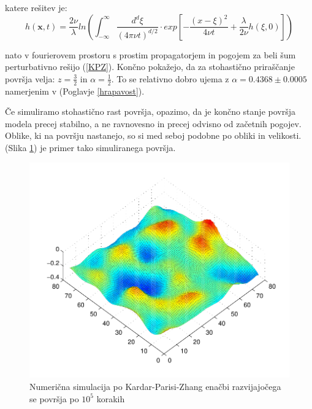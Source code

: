 \documentclass[a4paper, oneside, 12pt]{book}
\begin{document}
        katere rešitev je:
        \begin{equation}
            h(\mathbf{x},t) = \frac{2 \nu}{\lambda} ln \left( \int_{-\infty}^{\infty} \frac{d^d \xi}{(4 \pi \nu t)^{d/2}} \cdot exp \left[-\frac{(x-\xi)^2}{4 \nu t} + \frac{\lambda}{2 \nu}h(\xi,0) \right] \right)
        \end{equation}

            \cite{kardar1986dynamic} nato v fourierovem prostoru s prostim propagatorjem in pogojem za beli šum perturbativno rešijo (\ref{KPZ}). Končno pokažejo, da za stohastično priraščanje površja velja: $z = \frac{3}{2}$ in $\alpha=\frac{1}{2}$. To se relativno dobro ujema z $\alpha=0.4368 \pm 0.0005$ namerjenim v (Poglavje \ref{hrapavost}).


            Če simuliramo stohastično rast površja, opazimo, da je končno stanje površja modela precej stabilno, a ne ravnovesno in precej odvisno od začetnih pogojev. Oblike, ki na površju nastanejo, so si med seboj podobne po obliki in velikosti. (Slika \ref{fig:KPZ-numericno}) je primer tako simuliranega površja.

            \begin{figure}[H]
              \begin{center}
                \includegraphics[width=15cm]{slike/KPZ-numericno}
              \end{center}
              \caption{Numerična simulacija po Kardar-Parisi-Zhang enačbi razvijajočega se površja po $10^5$ korakih}
              \label{fig:KPZ-numericno}
            \end{figure}
\end{document}
